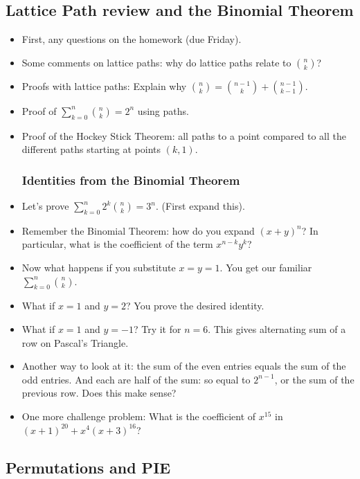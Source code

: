 \subsection*{Lattice Path review and the Binomial Theorem}
\begin{itemize}
\item First, any questions on the homework (due Friday).
\item Some comments on lattice paths: why do lattice paths relate to ${n \choose k}$?
\item Proofs with lattice paths: Explain why ${n \choose k} = {n-1 \choose k} + {n-1 \choose k-1}$.
\item Proof of $\sum_{k=0}^n{n\choose k} = 2^n$ using paths.
\item Proof of the Hockey Stick Theorem: all paths to a point compared to all the different paths starting at points $(k, 1)$.
\subsubsection*{Identities from the Binomial Theorem}
\item Let's prove $\sum_{k=0}^n 2^k{n\choose k} = 3^n$.  (First expand this).
\item Remember the Binomial Theorem: how do you expand $(x + y)^n$?  In particular, what is the coefficient of the term $x^{n-k}y^k$?
\item Now what happens if you substitute $x = y = 1$.  You get our familiar $\sum_{k=0}^n {n\choose k}$. 
\item What if $x = 1$ and $y = 2$?  You prove the desired identity.
\item What if $x = 1$ and $y = -1$?  Try it for $n = 6$.  This gives alternating sum of a row on Pascal's Triangle.
\item Another way to look at it: the sum of the even entries equals the sum of the odd entries.  And each are half of the sum: so equal to $2^{n-1}$, or the sum of the previous row.  Does this make sense?
\item One more challenge problem: What is the coefficient of $x^{15}$ in $(x+1)^{20} + x^4(x+3)^{16}$?
\end{itemize}



\subsection*{Permutations and PIE}

